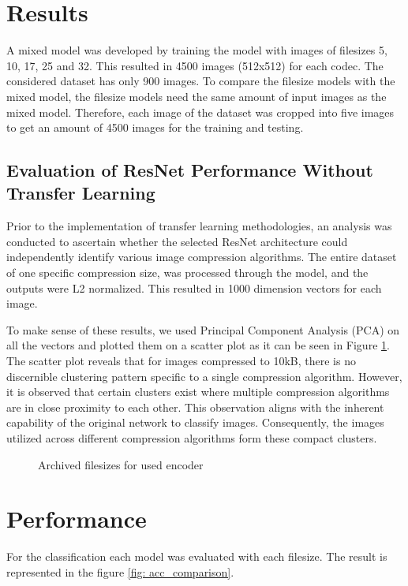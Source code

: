 \section{Results}
\label{Results}
A mixed model was developed by training the model with images of filesizes 5, 10, 17, 25 and 32. This resulted in 4500 images (512x512) for each codec. The considered dataset has only 900 images. To compare the filesize models with the mixed model, the filesize models need the same amount of input images as the mixed model. Therefore, each image of the dataset was cropped into five images to get an amount of 4500 images for the training and testing.

\subsection{Evaluation of ResNet Performance Without Transfer Learning} 
Prior to the implementation of transfer learning methodologies, an analysis was conducted to ascertain whether the selected ResNet architecture could independently identify various image compression algorithms. The entire dataset of one specific compression size, was processed through the model, and the outputs were L2 normalized. This resulted in 1000 dimension vectors for each image.

To make sense of these results, we used Principal Component Analysis (PCA) on all the vectors and plotted them on a scatter plot as it can be seen in Figure \ref{fig: no_transfer}. The scatter plot reveals that for images compressed to 10kB, there is no discernible clustering pattern specific to a single compression algorithm. However, it is observed that certain clusters exist where multiple compression algorithms are in close proximity to each other. This observation aligns with the inherent capability of the original network to classify images. Consequently, the images utilized across different compression algorithms form these compact clusters.

\begin{figure}[h!]
	\centering
	\resizebox{\textwidth}{!}{}
    \caption{Archived filesizes for used encoder}
	\label{fig: no_transfer}
\end{figure}

\section{Performance}
For the classification each model was evaluated with each filesize. The result is represented in the figure \ref{fig: acc_comparison}.

